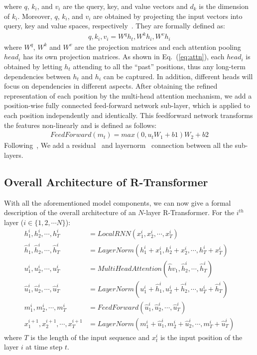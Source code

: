 \documentclass{article} \usepackage{iclr2019_conference,times}
\begin{document}
\noindent where $q$, $k_i$, and $v_i$ are the query, key, and value vectors and $d_k$ is the dimension of $k_i$. Moreover, $q$, $k_i$, and $v_i$ are obtained by projecting the input vectors into query, key and value spaces, respectively~\citep{vaswani2017attention}. They are formally defined as:
\begin{align}
q, k_i, v_i = W^qh_t, W^kh_i, W^vh_i
\end{align}
\noindent where $W^q$, $W^k$ and $W^v$ are the projection matrices and each  attention pooling $head_i$ has its own projection matrices. As shown in Eq.~(\ref{eq:attn}), each $head_i$ is obtained by letting $h_t$ attending to all the ``past'' positions, thus any long-term dependencies between $h_t$ and $h_i$ can be captured. In addition, different heads will focus on dependencies in different aspects. After obtaining the refined representation of each position by the multi-head attention mechanism, we add a position-wise fully connected feed-forward network sub-layer, which is applied to each position independently and identically. This feedforward network transforms the features non-linearly and is defined as follows:
\begin{align}
FeedForward(m_t) = max(0, u_tW_1 + b1)W_2 + b2
\end{align}
Following~\citep{vaswani2017attention}, We add a residual~\citep{he2016deep} and layernorm~\citep{ba2016layer} connection between all the sub-layers.

\subsection{Overall Architecture of R-Transformer}

With all the aforementioned model components, we can now give a formal description of the overall architecture of an $N$-layer R-Transformer. For the $i^{th}$ layer ($i \in \{ 1, 2, \cdots N\}$):
\begin{align}
\label{eq:layer}
h^i_1, h^i_2, \cdots, h^i_T &=  LocalRNN(x^i_1, x^i_2, \cdots, x^i_T) \\ \nonumber
\hat{h}^i_1, \hat{h}^i_2, \cdots, \hat{h}^i_T &= LayerNorm(h^i_1 + x^i_1, h^i_2+ x^i_2, \cdots, h^i_T + x^i_T) \\ \nonumber
u^i_1, u^i_2, \cdots, u^i_T &=  MultiHeadAttention(\hat{h}v_1, \hat{h}^i_2, \cdots, \hat{h}^i_T) \\ \nonumber
\hat{u}^i_1, \hat{u}^i_2, \cdots, \hat{u}^i_T &= LayerNorm(u^i_1 + \hat{h}^i_1, u^i_2 + \hat{h}^i_2, \cdots, u^i_T + \hat{h}^i_T ) \\ \nonumber
m^i_1, m^i_2, \cdots, m^i_T &= FeedForward(\hat{u}^i_1, \hat{u}^i_2, \cdots, \hat{u}^i_T) \\ \nonumber
x^{i+1}_1, x^{i+1}_2, \cdots, x^{i+1}_T &= LayerNorm(m^i_1 + \hat{u}^i_1, m^i_2 + \hat{u}^i_2, \cdots, m^i_T + \hat{u}^i_T)
\end{align}
\noindent where $T$ is the length of the input sequence and $x^i_t$ is the input position of the layer $i$ at time step $t$.
\end{document}

